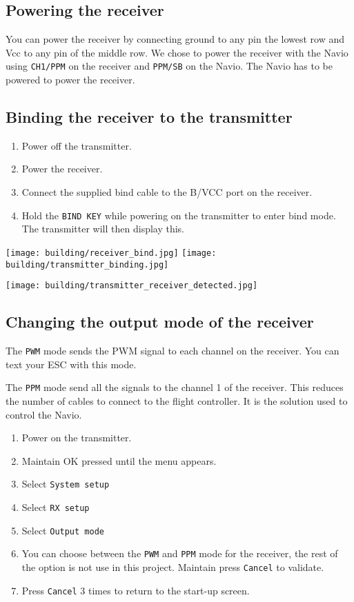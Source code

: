 \subsection{Powering the receiver}
You can power the receiver by connecting ground to any pin the lowest row and Vcc to any pin of the middle row.
We chose to power the receiver with the Navio using \texttt{CH1/PPM} on the receiver and \texttt{PPM/SB} on the Navio. The Navio has to be powered to power the receiver.

\subsection{Binding the receiver to the transmitter}
\begin{enumerate}
    \item Power off the transmitter.
    \item Power the receiver.
    \item Connect the supplied bind cable to the B/VCC port on the receiver.
    \item Hold the \texttt{BIND KEY} while powering on the transmitter to enter bind mode. The transmitter will then display this.
\end{enumerate}


\texttt{[image: building/receiver\_bind.jpg]}
\texttt{[image: building/transmitter\_binding.jpg]}

\texttt{[image: building/transmitter\_receiver\_detected.jpg]}

\subsection{Changing the output mode of the receiver}
The \texttt{PWM} mode sends the PWM signal to each channel on the receiver. You can text your ESC with this mode.

The \texttt{PPM} mode send all the signals to the channel 1 of the receiver. This reduces the number of cables to connect to the flight controller. It is the solution used to control the Navio.

\begin{enumerate}
    \item Power on the transmitter.
    \item Maintain OK pressed until the menu appears.
    \item Select \texttt{System setup}
    \item Select \texttt{RX setup}
    \item Select \texttt{Output mode}
    \item You can choose between the \texttt{PWM} and \texttt{PPM} mode for the receiver, the rest of the option is not use in this project. Maintain press \texttt{Cancel} to validate.
    \item Press \texttt{Cancel} 3 times to return to the start-up screen.
\end{enumerate}


